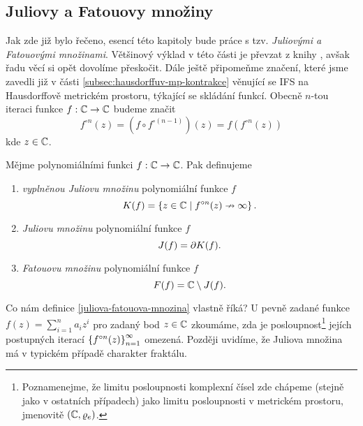 \subsection{Juliovy a Fatouovy množiny}\label{subsec:juliovy-fatouovy-mnoziny}

Jak zde již bylo řečeno, esencí této kapitoly bude práce s tzv. \emph{Juliovými a Fatouovými množinami}. Většinový výklad v této části je převzat z knihy \cite[str. 235]{Falconer1989}, avšak řadu věcí si opět dovolíme přeskočit. Dále ještě připomeňme značení, které jsme zavedli již v části \ref{subsec:hausdorffuv-mp-kontrakce} věnující se IFS na Hausdorffově metrickém prostoru, týkající se skládání funkcí. Obecně $n$-tou iteraci funkce $f:\mathbb{C} \rightarrow \mathbb{C}$ budeme značit
\[f^{\circ n}(z)=(f\circ f^{\circ(n-1)})(z)=f(f^{\circ n}(z))\]
kde $z\in\mathbb{C}$.
\begin{definition}\label{juliova-fatouova-mnozina}
    Mějme polynomiálními funkci $f:\mathbb{C} \rightarrow \mathbb{C}$. Pak definujeme
    \begin{enumerate}[label=(\alph*)]
        \item \emph{vyplněnou Juliovu množinu} polynomiální funkce $f$
        \[K(f)=\left\{z\in\mathbb{C}\mid f^{\circ n}(z)\nrightarrow\infty\right\}.\]
        \item \emph{Juliovu množinu} polynomiální funkce $f$
        \[J(f)=\partial K(f).\]
        \item \emph{Fatouovu množinu} polynomiální funkce $f$
        \[F(f)=\mathbb{C}\setminus J(f).\]
    \end{enumerate}
\end{definition}
Co nám definice \ref{juliova-fatouova-mnozina} vlastně říká? U pevně zadané funkce $f(z)=\sum_{i=1}^{n}a_iz^i$ pro zadaný bod $z\in\mathbb{C}$ zkoumáme, zda je posloupnost\footnote{Poznamenejme, že limitu posloupnosti komplexní čísel zde chápeme (stejně jako v ostatních případech) jako limitu posloupnosti v metrickém prostoru, jmenovitě $(\mathbb{C},\varrho_e)$.} jejích postupných iterací $\left\{f^{\circ n}(z)\right\}_{n=1}^\infty$ omezená. Později uvidíme, že Juliova množina má v typickém případě charakter fraktálu.
